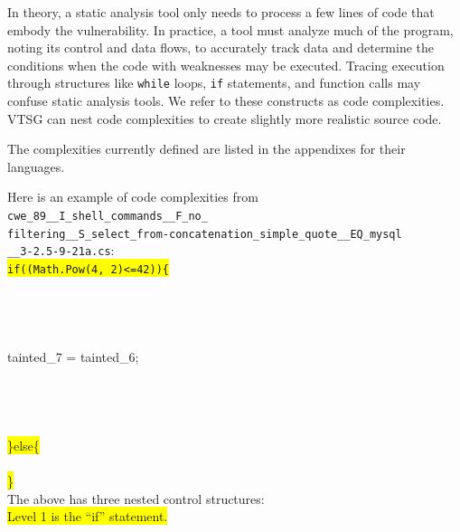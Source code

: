 \documentclass[12pt]{article}
\begin{document}
In theory, a static analysis tool only needs to process a few lines of
code that
embody the vulnerability. In practice, a tool must analyze much
of the program,
noting its control and data flows, to accurately track data and
determine the
conditions when the code with weaknesses may be executed.
Tracing execution through structures like \verb|while| loops, \verb|if|
statements, and function calls may confuse static analysis tools.
We refer to these constructs as code complexities.
VTSG can nest code complexities to create slightly more realistic source code.

The complexities currently defined
are listed in the appendixes for their languages.

Here is an example of code complexities from \verb|cwe_89__I_shell_commands__F_no_|\\
\verb|filtering__S_select_from-concatenation_simple_quote__EQ_mysql| \\
\verb|__3-2.5-9-21a.cs|: \\
{\texttt
{\colorbox{yellow}{if((Math.Pow(4, 2)<=42))\{}}\\
\\
\\
\\
\\
\hspace*{6em}tainted\_7 = tainted\_6;\\
\\
\\
\\              
\\
{\colorbox{yellow}{\}else\{}}\\
\\
{\colorbox{yellow}{\}}}
}
\\
The above has three nested control structures:\\
{\colorbox{yellow}{Level 1 is the ``if'' statement.}}\\
\\
\end{document}
